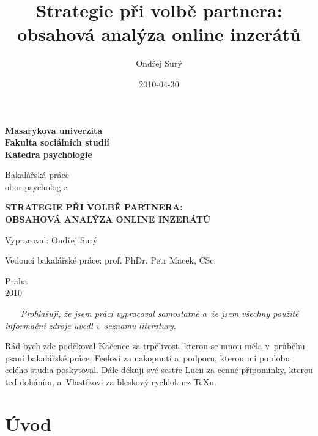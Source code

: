 \documentclass[a4paper, 12pt, notitlepage, oneside, numbers=noenddot]{report}
\title{Strategie při volbě partnera: obsahová analýza online inzerátů}
\author{Ondřej Surý}
\date{2010-04-30}
\begin{document}
\pagestyle{empty}
\begin{titlepage}

  \begin{center}
    \bf{Masarykova univerzita}\\
    \bf{Fakulta sociálních studií}\\
    \bf{Katedra psychologie}\\

    \vspace{2cm}

    Bakalářská práce\\
    obor psychologie

    \vspace{2cm}

    \large{\bf{STRATEGIE PŘI VOLBĚ PARTNERA:\\ OBSAHOVÁ ANALÝZA ONLINE INZERÁTŮ}}\\

    \normalsize

    \vspace{2cm}

    \noindent Vypracoval: Ondřej Surý\\
    \vspace{2cm}

    \noindent Vedoucí bakalářské práce: prof. PhDr. Petr Macek, CSc. \\
  
    \vfill

    Praha\\
    2010
  \end{center}
\end{titlepage}

\pagestyle{empty}
~~~
\vfill
\emph{Prohlašuji, že jsem práci vypracoval samostatně a~že jsem všechny použité informační zdroje uvedl v~seznamu literatury.}
\clearpage

Rád bych zde poděkoval Kačence za trpělivost, kterou se mnou měla
v~průběhu psaní bakalářské práce, Feelovi za nakopnutí a~podporu,
kterou mi po dobu celého studia poskytoval.  Dále děkuji své sestře
Lucii za cenné připomínky, kterou teď doháním, a~Vlastíkovi za
bleskový rychlokurz TeXu.

\clearpage
\thispagestyle{empty}
\tableofcontents
\clearpage
\thispagestyle{empty}
\listoftables
\clearpage

\pagestyle{plain}
\setcounter{page}{1}

\chapter{Úvod}
\end{document}

